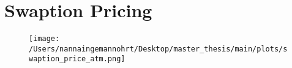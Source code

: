 \section{Swaption Pricing}

\begin{figure}[H]
    \centering
    \texttt{[image: /Users/nannaingemannohrt/Desktop/master\_thesis/main/plots/swaption\_price\_atm.png]}
    \caption{}
    \label{fig:swaption_price_atm}
\end{figure}
\noindent